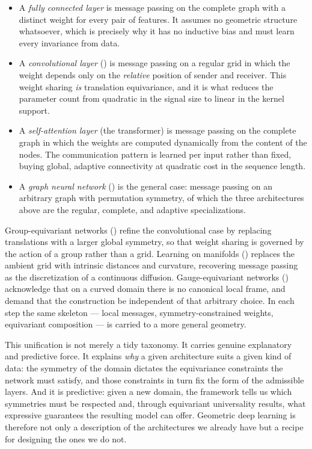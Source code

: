 \begin{itemize}
  \item A \emph{fully connected layer} is message passing on the complete graph
  with a distinct weight for every pair of features. It assumes no geometric
  structure whatsoever, which is precisely why it has no inductive bias and must
  learn every invariance from data.
  \item A \emph{convolutional layer} () is message passing on a
  regular grid in which the weight depends only on the \emph{relative} position
  of sender and receiver. This weight sharing \emph{is} translation equivariance,
  and it is what reduces the parameter count from quadratic in the signal size to
  linear in the kernel support.
  \item A \emph{self-attention layer} (the transformer) is message passing on the
  complete graph in which the weights are computed dynamically from the content
  of the nodes. The communication pattern is learned per input rather than fixed,
  buying global, adaptive connectivity at quadratic cost in the sequence length.
  \item A \emph{graph neural network} () is the general case:
  message passing on an arbitrary graph with permutation symmetry, of which the
  three architectures above are the regular, complete, and adaptive specializations.
\end{itemize}

Group-equivariant networks () refine the convolutional case by
replacing translations with a larger global symmetry, so that weight sharing is
governed by the action of a group rather than a grid. Learning on manifolds
() replaces the ambient grid with intrinsic distances and
curvature, recovering message passing as the discretization of a continuous
diffusion. Gauge-equivariant networks () acknowledge that on a
curved domain there is no canonical local frame, and demand that the construction
be independent of that arbitrary choice. In each step the same skeleton ---
local messages, symmetry-constrained weights, equivariant composition --- is
carried to a more general geometry.

This unification is not merely a tidy taxonomy. It carries genuine explanatory
and predictive force. It explains \emph{why} a given architecture suits a given
kind of data: the symmetry of the domain dictates the equivariance constraints
the network must satisfy, and those constraints in turn fix the form of the
admissible layers. And it is predictive: given a new domain, the framework tells
us which symmetries must be respected and, through equivariant universality
results, what expressive guarantees the resulting model can offer. Geometric deep
learning is therefore not only a description of the architectures we already have
but a recipe for designing the ones we do not.

